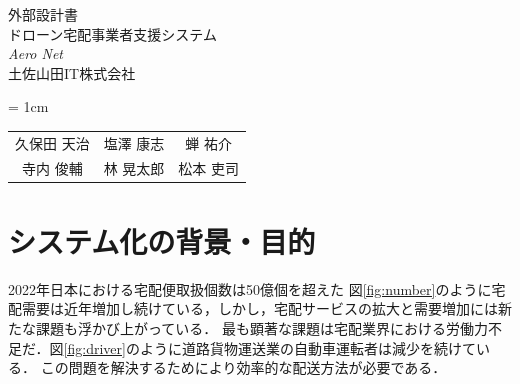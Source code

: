 \documentclass[a4paper, titlepage]{jsarticle}
\date{\today}
\newcommand{\system}{\textsl{Aero Net}}
\begin{document}
\begin{titlepage}
  \centering
  \vspace*{150truept}
  {\Large 外部設計書}\\
  \vspace*{50truept}
  {\Huge ドローン宅配事業者支援システム} \\
  \vspace{15truept}
  {\Huge \system} \\
  \vspace{50truept}
  {\LARGE 土佐山田IT株式会社}\\
  \vspace{20truept}
  {\large{\tabcolsep = 1cm
      \begin{tabular}{ccc}
        久保田 天治 & 塩澤 康志 & 蝉 祐介  \\
        寺内 俊輔  & 林 晃太郎 & 松本 吏司
      \end{tabular}
    }}
\end{titlepage}
\newcommand{\fig}[2]{
  \begin{figure}[H]
    \centering
    \texttt{[image: flow/\#1.pdf]}
    \caption{#2}
    \label{fig:#1}
  \end{figure}
  \clearpage
}
\newcommand{\ui}[2]{
  \begin{figure}[H]
    \centering
    \texttt{[image: ui/\#1]}
    \caption{#2}
    \label{fig:#1}
  \end{figure}
}

\tableofcontents

\clearpage

\section{システム化の背景・目的}
2022年日本における宅配便取扱個数は50億個を超えた
図\ref{fig:number}のように宅配需要は近年増加し続けている，しかし，宅配サービスの拡大と需要増加には新たな課題も浮かび上がっている．
最も顕著な課題は宅配業界における労働力不足だ．図\ref{fig:driver}のように道路貨物運送業の自動車運転者は減少を続けている．
この問題を解決するためにより効率的な配送方法が必要である．
\end{document}
